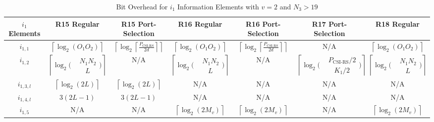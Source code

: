 \documentclass[lettersize,journal]{IEEEtran}
\begin{document}
\begin{table}[t]
\centering
{\renewcommand{\arraystretch}{2.2} 
\caption{Bit Overhead for $i_1$ Information Elements with $v=2$ and $N_3>19$}
\label{bit1}
\begin{tabular}{|c|c|c|c|c|c|c|}
\hline
\rowcolor[HTML]{EFEFEF} 
\cellcolor[HTML]{EFEFEF}\textbf{$i_1$ Elements} & \cellcolor[HTML]{EFEFEF} \textbf{R15 Regular} & \textbf{R15 Port-Selection} & \textbf{R16 Regular} & \textbf{R16 Port-Selection} & \textbf{R17 Port-Selection} & \textbf{R18 Regular} \\ \hline
$i_{1,1}$ & $\left\lceil {{{\log }_2}\left( {{O_1}{O_2}} \right)} \right\rceil $  & $\left\lceil {{{\log }_2}\left\lceil {\frac{{{P_\text{CSI-RS}}}}{{2d}}} \right\rceil } \right\rceil $ & $\left\lceil {{{\log }_2}\left( {{O_1}{O_2}} \right)} \right\rceil $  & $\left\lceil {{{\log }_2}\left\lceil {\frac{{{P_\text{CSI-RS}}}}{{2d}}} \right\rceil } \right\rceil $ & N/A & $\left\lceil {{{\log }_2}\left( {{O_1}{O_2}} \right)} \right\rceil $ \\ \hline
$i_{1,2}$ & $\left\lceil {{{\log }_2}\Big( {\begin{aligned}
&{{N_1}{N_2}}\\
&\;\;\;L
\end{aligned}} \Big)} \right\rceil$ &  N/A & $\left\lceil {{{\log }_2}\Big( {\begin{aligned}
&{{N_1}{N_2}}\\
&\;\;\;L
\end{aligned}} \Big)} \right\rceil$ &  N/A & $\left\lceil {{{\log }_2}\Big( {\begin{aligned}
&{{P_\text{CSI-RS}}/2}\\
&\;\;\;K_1/2
\end{aligned}} \Big)} \right\rceil$ & $\left\lceil {{{\log }_2}\Big( {\begin{aligned}
&{{N_1}{N_2}}\\
&\;\;\;L
\end{aligned}} \Big)} \right\rceil$ \\ \hline
$i_{1,3,l}$ & $\left\lceil {{{\log }_2}\left( {2L} \right)} \right\rceil $ & $\left\lceil {{{\log }_2}\left( {2L} \right)} \right\rceil $  &  N/A &  N/A & N/A  &  N/A \\ \hline
$i_{1,4,l}$ & $3\left( {2L - 1} \right)$ & $3\left( {2L - 1} \right)$ &  N/A &  N/A &  N/A &  N/A \\ \hline
$i_{1,5}$ &  N/A &  N/A & $\left\lceil\log_2(2M_v)\right\rceil$ & $\left\lceil\log_2(2M_v)\right\rceil$ &  N/A & $\left\lceil\log_2(2M_v)\right\rceil$  \\ \hline

\end{tabular}}
\end{table}
\end{document}
